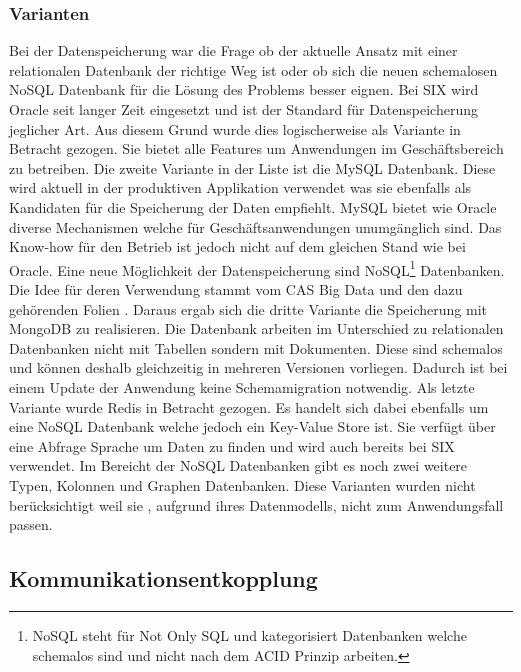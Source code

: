 \subsubsection{Varianten}
Bei der Datenspeicherung war die Frage ob der aktuelle Ansatz mit einer relationalen Datenbank der richtige Weg ist oder ob sich die neuen schemalosen NoSQL Datenbank für die Lösung des Problems besser eignen.\newline
Bei SIX wird Oracle seit langer Zeit eingesetzt und ist der Standard für Datenspeicherung jeglicher Art. Aus diesem Grund wurde dies logischerweise als Variante in Betracht gezogen. Sie bietet alle Features um Anwendungen im Geschäftsbereich zu betreiben.\newline
Die zweite Variante in der Liste ist die MySQL Datenbank. Diese wird aktuell in der produktiven Applikation verwendet was sie ebenfalls als Kandidaten für die Speicherung der Daten empfiehlt.
MySQL bietet wie Oracle diverse Mechanismen welche für Geschäftsanwendungen unumgänglich sind. Das Know-how für den Betrieb ist jedoch nicht auf dem gleichen Stand wie bei Oracle.\newline
Eine neue Möglichkeit der Datenspeicherung sind NoSQL\footnote{NoSQL steht für Not Only SQL und kategorisiert Datenbanken welche schemalos sind und nicht nach dem ACID Prinzip arbeiten.} Datenbanken. Die Idee für deren Verwendung stammt vom CAS Big Data und den dazu gehörenden Folien \cite{nosqlintro}. Daraus ergab sich die dritte Variante die Speicherung mit MongoDB zu realisieren. Die Datenbank arbeiten im Unterschied zu relationalen Datenbanken nicht mit Tabellen sondern mit Dokumenten. Diese sind schemalos und können deshalb gleichzeitig in mehreren Versionen vorliegen. Dadurch ist bei einem Update der Anwendung keine Schemamigration notwendig.\newline
Als letzte Variante wurde Redis in Betracht gezogen. Es handelt sich dabei ebenfalls um eine NoSQL Datenbank welche jedoch ein Key-Value Store ist. Sie verfügt über eine Abfrage Sprache um Daten zu finden und wird auch bereits bei SIX verwendet. Im Bereicht der NoSQL Datenbanken gibt es noch zwei weitere Typen, Kolonnen und Graphen Datenbanken. Diese Varianten wurden nicht berücksichtigt weil sie , aufgrund ihres Datenmodells, nicht zum Anwendungsfall passen.

\subsection{Kommunikationsentkopplung}

